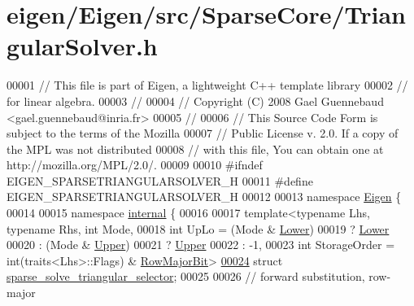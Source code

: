 \hypertarget{eigen_2_eigen_2src_2_sparse_core_2_triangular_solver_8h_source}{}\section{eigen/\+Eigen/src/\+Sparse\+Core/\+Triangular\+Solver.h}
\label{eigen_2_eigen_2src_2_sparse_core_2_triangular_solver_8h_source}

\begin{DoxyCode}
00001 \textcolor{comment}{// This file is part of Eigen, a lightweight C++ template library}
00002 \textcolor{comment}{// for linear algebra.}
00003 \textcolor{comment}{//}
00004 \textcolor{comment}{// Copyright (C) 2008 Gael Guennebaud <gael.guennebaud@inria.fr>}
00005 \textcolor{comment}{//}
00006 \textcolor{comment}{// This Source Code Form is subject to the terms of the Mozilla}
00007 \textcolor{comment}{// Public License v. 2.0. If a copy of the MPL was not distributed}
00008 \textcolor{comment}{// with this file, You can obtain one at http://mozilla.org/MPL/2.0/.}
00009 
00010 \textcolor{preprocessor}{#ifndef EIGEN\_SPARSETRIANGULARSOLVER\_H}
00011 \textcolor{preprocessor}{#define EIGEN\_SPARSETRIANGULARSOLVER\_H}
00012 
00013 \textcolor{keyword}{namespace }\hyperlink{namespace_eigen}{Eigen} \{ 
00014 
00015 \textcolor{keyword}{namespace }\hyperlink{namespaceinternal}{internal} \{
00016 
00017 \textcolor{keyword}{template}<\textcolor{keyword}{typename} Lhs, \textcolor{keyword}{typename} Rhs, \textcolor{keywordtype}{int} Mode,
00018   \textcolor{keywordtype}{int} UpLo = (Mode & \hyperlink{group__enums_gga39e3366ff5554d731e7dc8bb642f83cda891792b8ed394f7607ab16dd716f60e6}{Lower})
00019            ? \hyperlink{group__enums_gga39e3366ff5554d731e7dc8bb642f83cda891792b8ed394f7607ab16dd716f60e6}{Lower}
00020            : (Mode & \hyperlink{group__enums_gga39e3366ff5554d731e7dc8bb642f83cda6bcb58be3b8b8ec84859ce0c5ac0aaec}{Upper})
00021            ? \hyperlink{group__enums_gga39e3366ff5554d731e7dc8bb642f83cda6bcb58be3b8b8ec84859ce0c5ac0aaec}{Upper}
00022            : -1,
00023   \textcolor{keywordtype}{int} StorageOrder = int(traits<Lhs>::Flags) & \hyperlink{group__flags_gae4f56c2a60bbe4bd2e44c5b19cbe8762}{RowMajorBit}>
\hyperlink{struct_eigen_1_1internal_1_1sparse__solve__triangular__selector}{00024} \textcolor{keyword}{struct }\hyperlink{struct_eigen_1_1internal_1_1sparse__solve__triangular__selector}{sparse\_solve\_triangular\_selector};
00025 
00026 \textcolor{comment}{// forward substitution, row-major}

\end{DoxyCode}
